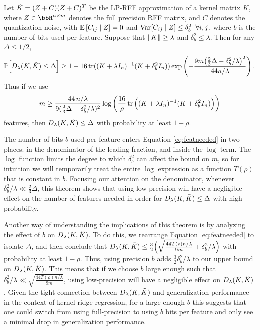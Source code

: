 \begin{theorem}
	\label{thm2}
	Let $\tilde{K} = (Z+C)(Z+C)^T$ be the LP-RFF approximation of a kernel matrix $K$, where $Z\in\RR^{n\times m}$ denotes the full precision RFF matrix, and $C$ denotes the quantization noise, with $\expect{}{C_{ij} \mid Z} = 0$ and ${\rm Var}[C_{ij} \mid Z] \leq \delta_b^2 \;\;\forall i,j$, where $b$ is the number of bits used per feature. Suppose that $\|K\| \geq \lambda$ and $\delta^2_b \leq \lambda$. Then for any $\Delta \leq 1/2$,
	\begin{equation*}
	\mathbb{P}\Big[D_{\lambda}(K,\tilde{K}) \leq \Delta\Big] \geq 1 - 16 \mathop{\rm tr}((K + \lambda I_n)^{-1} (K + \delta^2_b I_n)) \exp \left( -\frac{9m \big(\frac{2}{3}\Delta - \delta^2_b / \lambda\big)^2}{44n/\lambda} \right).
	\end{equation*}
	Thus if we use 
	\begin{equation}
	\label{eq:featneeded}
	m \geq \frac{44\, n/\lambda}{9(\frac{2}{3}\Delta - \delta_b^2/\lambda)^{2}} \log \bigg(\frac{16}{\rho} \mathop{\rm tr}\Big((K + \lambda I_n)^{-1} (K + \delta^2_b I_n)\Big) \bigg)
	\end{equation}
	features, then $D_\lambda(K,\tilde{K})\leq \Delta$  with probability at least $1 - \rho$.
\end{theorem}

The number of bits $b$ used per feature enters Equation \ref{eq:featneeded} in two places: in the denominator of the leading fraction, and inside the $\log$ term. The $\log$ function limits the degree to which $\delta_b^2$ can affect the bound on $m$, so for intuition we will temporarily treat the entire $\log$ expression as a function $T(\rho)$ that is constant in $b$. Focusing our attention on the denominator, whenever $\delta_b^2/\lambda \ll \frac{2}{3}\Delta$, this theorem shows that using low-precision will have a negligible effect on the number of features needed in order for $D_{\lambda}(K,\tilde{K}) \leq \Delta$ with high probability.

Another way of understanding the implications of this theorem is by analyzing the effect of $b$ on $D_{\lambda}(K,\tilde{K})$. To do this, we rearrange Equation \ref{eq:featneeded} to isolate $\Delta$, and then conclude that $D_{\lambda}(K,\tilde{K}) \leq \frac{3}{2} \Big(\sqrt{\frac{44T(\rho)n/\lambda}{9m}} + \delta_b^2/\lambda\Big)$ with probability at least $1-\rho$.  Thus, using precision $b$ adds $\frac{3}{2}\delta_b^2/\lambda$ to our upper bound on $D_{\lambda}(K,\tilde{K})$.  This means that if we choose $b$ large enough such that $\delta_b^2/\lambda \ll \sqrt{\frac{44T(\rho)n/\lambda}{9m}}$, using low-precision will have a negligible effect on $D_{\lambda}(K,\tilde{K})$.  Given the tight connection between $D_{\lambda}(K,\tilde{K})$ and generalization performance in the context of kernel ridge regression, for a large enough $b$ this suggests that one could switch from using full-precision to using $b$ bits per feature and only see a minimal drop in generalization performance.

